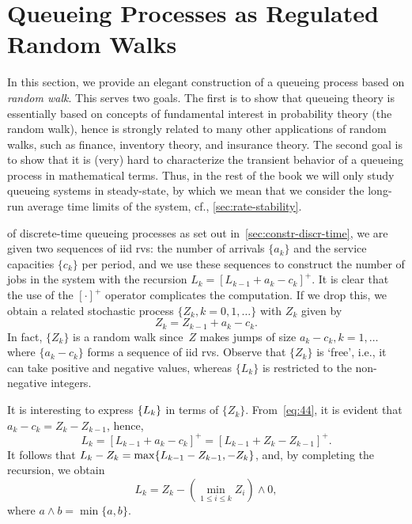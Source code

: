 \documentclass[stochastic-or.tex]{subfiles}
\begin{document}
\section{Queueing Processes as Regulated Random Walks}
\label{sec:queu-proc-as}


In this section, we provide an elegant construction of a queueing process based on  \emph{random walk}.
This serves two goals.
The first is to show that queueing theory is essentially based on concepts of fundamental interest in probability theory (the random walk), hence is strongly related to many other applications of random walks, such as finance, inventory theory, and insurance theory.
The second goal is to show that it is (very) hard to characterize the transient behavior of a queueing process in mathematical terms.
Thus, in the rest of the book we will only study queueing systems in steady-state, by which we mean that we consider the long-run average time limits of the system, cf., \cref{sec:rate-stability}.




 of discrete-time queueing processes as set out in~\cref{sec:constr-discr-time}, we are given two sequences of iid rvs: the number of arrivals $\{a_k\}$ and the service capacities $\{c_k\}$ per period, and we use these sequences to construct the number of jobs in the system with the recursion $L_k = [L_{k-1} +a_k- c_{k}]^+$.
It is clear that the use of the $[\cdot]^{+}$ operator complicates the computation.
If we drop this, we obtain a related stochastic process $\{Z_k, k=0,1,\ldots\}$ with $Z_k$ given by
\begin{equation}\label{eq:44}
 Z_k = Z_{k-1} + a_k - c_k.
\end{equation}
In fact, $\{Z_k\}$ is a random walk since~$Z$ makes jumps of size $a_k-c_k, k=1,\ldots$ where $\{a_k-c_k\}$ forms a sequence of iid rvs.
Observe that $\{Z_k\}$ is `free', i.e., it can take positive and negative values, whereas $\{L_{k}\}$ is restricted to the non-negative integers.

It is interesting to express $\{L_k\}$ in terms of $\{Z_k\}$. From~\cref{eq:44}, it is evident that $a_k - c_k = Z_k - Z_{k-1}$, hence,
\begin{equation*}
 L_k = [L_{k-1} +a_k- c_{k}]^+ = [L_{k-1} +Z_k- Z_{k-1}]^+.
\end{equation*}
It follows that  $L_k - Z_{k} = \max\{L_{k-1} - Z_{k-1}, -Z_k\}$,
and, by completing the recursion, we obtain
\begin{equation}\label{eq:reich1}
 L_k = Z_k - \left(\min_{1\leq i \leq k} Z_i\right)\wedge 0,
\end{equation}
where $a\wedge b = \min\{a,b\}$.
\end{document}
